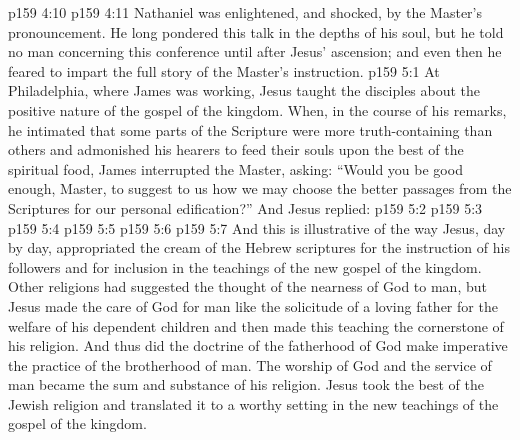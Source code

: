 \vs p159 4:10 
\vs p159 4:11 \pc Nathaniel was enlightened, and shocked, by the Master’s pronouncement. He long pondered this talk in the depths of his soul, but he told no man concerning this conference until after Jesus’ ascension; and even then he feared to impart the full story of the Master’s instruction.
\vs p159 5:1 At Philadelphia, where James was working, Jesus taught the disciples about the positive nature of the gospel of the kingdom. When, in the course of his remarks, he intimated that some parts of the Scripture were more truth\hyp{}containing than others and admonished his hearers to feed their souls upon the best of the spiritual food, James interrupted the Master, asking: “Would you be good enough, Master, to suggest to us how we may choose the better passages from the Scriptures for our personal edification?” And Jesus replied: 
\vs p159 5:2 
\vs p159 5:3 \pc {}
\vs p159 5:4 \pc {}
\vs p159 5:5 \pc {}
\vs p159 5:6 \pc {}
\vs p159 5:7 \pc And this is illustrative of the way Jesus, day by day, appropriated the cream of the Hebrew scriptures for the instruction of his followers and for inclusion in the teachings of the new gospel of the kingdom. Other religions had suggested the thought of the nearness of God to man, but Jesus made the care of God for man like the solicitude of a loving father for the welfare of his dependent children and then made this teaching the cornerstone of his religion. And thus did the doctrine of the fatherhood of God make imperative the practice of the brotherhood of man. The worship of God and the service of man became the sum and substance of his religion. Jesus took the best of the Jewish religion and translated it to a worthy setting in the new teachings of the gospel of the kingdom.
